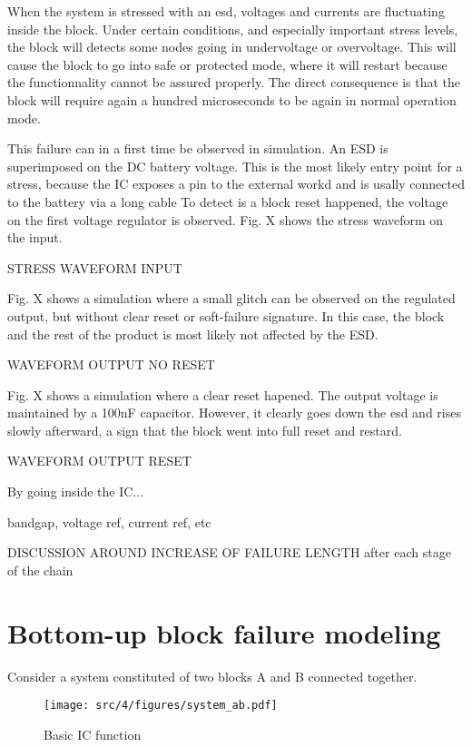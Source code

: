 When the system is stressed with an \gls{esd}, voltages and currents are fluctuating inside the block.
Under certain conditions, and especially important stress levels, the block will detects some nodes going in undervoltage or overvoltage.
This will cause the block to go into safe or protected mode, where it will restart because the functionnality cannot be assured properly.
The direct consequence is that the block will require again a hundred microseconds to be again in normal operation mode.

This failure can in a first time be observed in simulation.
An \gls{ESD} is superimposed on the DC battery voltage.
This is the most likely entry point for a stress, because the \gls{IC} exposes a pin to the external workd and is usally connected to the battery via a long cable
To detect is a block reset happened, the voltage on the first voltage regulator is observed.
Fig. X shows the stress waveform on the input.

STRESS WAVEFORM INPUT

Fig. X shows a simulation where a small glitch can be observed on the regulated output, but without clear reset or soft-failure signature.
In this case, the block and the rest of the product is most likely not affected by the ESD.

WAVEFORM OUTPUT NO RESET

Fig. X shows a simulation where a clear reset hapened.
The output voltage is maintained by a 100nF capacitor.
However, it clearly goes down  the \gls{esd} and rises slowly afterward, a sign that the block went into full reset and restard.

WAVEFORM OUTPUT RESET

By going inside the \gls{IC}...

bandgap, voltage ref, current ref, etc

DISCUSSION AROUND INCREASE OF FAILURE LENGTH after each stage of the chain

\section{Bottom-up block failure modeling}

Consider a system constituted of two blocks A and B connected together.

\begin{figure}[h]
  \centering
  \texttt{[image: src/4/figures/system\_ab.pdf]}
  \caption{Basic IC function}
  \label{basic_ic_function}
\end{figure}

